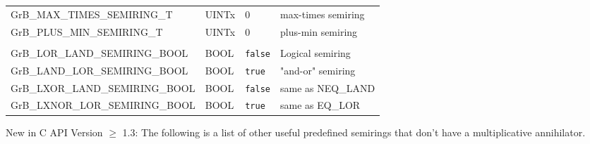 \documentclass[11pt]{article}
\begin{document}
\begin{tabular}{l|l|l|l}
{\sf GrB\_MAX\_TIMES\_SEMIRING\_T}    & {\sf UINTx}              & 0                    & max-times semiring \\
{\sf GrB\_PLUS\_MIN\_SEMIRING\_T}     & {\sf UINTx}              & 0                    & plus-min semiring  \\
                                      &                          &                      &                 \\
{\sf GrB\_LOR\_LAND\_SEMIRING\_BOOL}  & {\sf BOOL}               & {\tt false}          & Logical semiring   \\
{\sf GrB\_LAND\_LOR\_SEMIRING\_BOOL}  & {\sf BOOL}               & {\tt true}           & "and-or" semiring  \\
{\sf GrB\_LXOR\_LAND\_SEMIRING\_BOOL} & {\sf BOOL}               & {\tt false}          & same as {\sf NEQ\_LAND} \\
{\sf GrB\_LXNOR\_LOR\_SEMIRING\_BOOL} & {\sf BOOL}               & {\tt true}           & same as {\sf EQ\_LOR} \\
\end{tabular}


{\color{red} New in C API Version $\geq$ 1.3}: The following is a list of other 
useful predefined semirings that don't have a
multiplicative annihilator.
\end{document}
